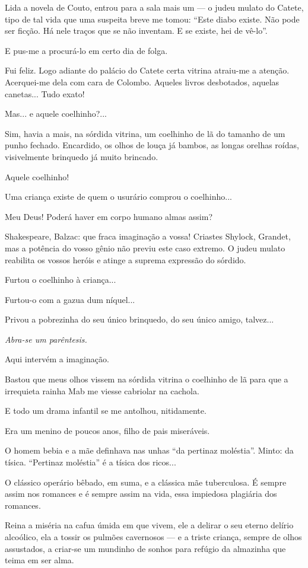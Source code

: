 Lida a novela de Couto, entrou para a sala mais um --- o judeu mulato do
Catete, tipo de tal vida que uma suspeita breve me tomou: ``Este diabo
existe. Não pode ser ficção. Há nele traços que se não inventam. E se
existe, hei de vê-lo''.

E pus-me a procurá-lo em certo dia de folga.

Fui feliz. Logo adiante do palácio do Catete certa vitrina atraiu-me a
atenção. Acerquei-me dela com cara de Colombo. Aqueles livros
desbotados, aquelas canetas... Tudo exato!

Mas... e aquele coelhinho?...

Sim, havia a mais, na sórdida vitrina, um coelhinho de lã do tamanho de
um punho fechado. Encardido, os olhos de louça já bambos, as longas
orelhas roídas, visivelmente brinquedo já muito brincado.

Aquele coelhinho!

Uma criança existe de quem o usurário comprou o coelhinho...

Meu Deus! Poderá haver em corpo humano almas assim?

Shakespeare, Balzac: que fraca imaginação a vossa! Criastes Shylock,
Grandet, mas a potência do vosso gênio não previu este caso extremo. O
judeu mulato reabilita os vossos heróis e atinge a suprema expressão do
sórdido.

Furtou o coelhinho à criança...

Furtou-o com a gazua dum níquel...

Privou a pobrezinha do seu único brinquedo, do seu único amigo,
talvez...

\emph{Abra-se um parêntesis.}

Aqui intervém a imaginação.

Bastou que meus olhos vissem na sórdida vitrina o coelhinho de lã para
que a irrequieta rainha Mab me viesse cabriolar na cachola.

E todo um drama infantil se me antolhou, nitidamente.

Era um menino de poucos anos, filho de pais miseráveis.

O homem bebia e a mãe definhava nas unhas ``da pertinaz moléstia''.
Minto: da tísica. ``Pertinaz moléstia'' é a tísica dos ricos...

O clássico operário bêbado, em suma, e a clássica mãe tuberculosa. É
sempre assim nos romances e é sempre assim na vida, essa impiedosa
plagiária dos romances.

Reina a miséria na cafua úmida em que vivem, ele a delirar o seu eterno
delírio alcoólico, ela a tossir os pulmões cavernosos --- e a triste
criança, sempre de olhos assustados, a criar-se um mundinho de sonhos
para refúgio da almazinha que teima em ser alma.

